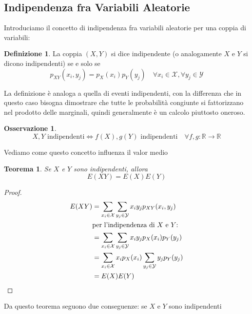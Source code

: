 \documentclass{article}
\theoremstyle{plain}
\newtheorem{teorema}{Teorema}[section]
\theoremstyle{definition}
\newtheorem{definizione}{Definizione}[section]
\newtheorem{osservazione}{Osservazione}[section]
\theoremstyle{remark}
\begin{document}
\subsection{Indipendenza fra Variabili Aleatorie} %
\label{sub:indipendenza_fra_variabili_aleatorie}
Introduciamo il concetto di indipendenza fra variabili aleatorie per una coppia di variabili:
\begin{definizione}
	La coppia $(X,Y)$ si dice indipendente (o analogamente $X$ e $Y$ si dicono indipendenti) se e solo se 
	\begin{equation*}
		p_{XY}(x_i,y_j)=p_X(x_i)p_Y(y_j)\quad\forall x_i\in\mathcal{X},\forall y_j\in\mathcal{Y}
	\end{equation*}
\end{definizione}
La definizione è analoga a quella di eventi indipendenti, con la differenza che in questo caso bisogna dimostrare che tutte le probabilità congiunte si fattorizzano nel prodotto delle marginali, quindi generalmente è un calcolo piuttosto oneroso.
\begin{osservazione}
	\begin{equation*}
		X,Y\text{ indipendenti}\Leftrightarrow f(X),g(Y)\text{ indipendenti}\quad\forall f,g:\mathds{R}\to\mathds{R}
	\end{equation*}
\end{osservazione}
Vediamo come questo concetto influenza il valor medio
\begin{teorema}
	Se $X$ e $Y$ sono indipendenti, allora
	\begin{equation*}
		E(XY)=E(X)E(Y)
	\end{equation*}
\end{teorema}
\begin{proof}
	\begin{align*}
		E(XY)&=\sum_{x_i\in\mathcal{X}}\sum_{y_j\in\mathcal{Y}}x_iy_jp_{XY}(x_i,y_j)\\
		&\text{per l'indipendenza di }X\text{ e }Y\text{:}\\
		&=\sum_{x_i\in\mathcal{X}}\sum_{y_j\in\mathcal{Y}}x_iy_jp_X(x_i)p_Y(y_j)\\
		&=\sum_{x_i\in\mathcal{X}}x_ip_X(x_i)\sum_{y_j\in\mathcal{Y}}y_jp_Y(y_j)\\
		&=E(X)E(Y)\qedhere
	\end{align*}
\end{proof}
Da questo teorema seguono due conseguenze: se $X$ e $Y$ sono indipendenti
\end{document}
